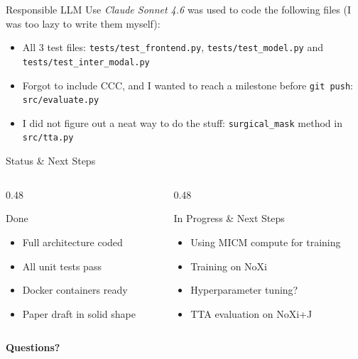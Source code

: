 \documentclass[aspectratio=169]{beamer}
\begin{document}
	\begin{frame}{Responsible LLM Use}
		\textit{Claude Sonnet 4.6} was used to code the following files (I was too lazy to write them myself):
		\begin{itemize}
			\item All 3 test files: \texttt{tests/test\_frontend.py}, \texttt{tests/test\_model.py} and \texttt{tests/test\_inter\_modal.py}
			\item Forgot to include CCC, and I wanted to reach a milestone before \texttt{git push}: \texttt{src/evaluate.py}
			\item I did not figure out a neat way to do the stuff: \texttt{surgical\_mask} method in \texttt{src/tta.py} 
		\end{itemize}
	\end{frame}

	\begin{frame}{Status \& Next Steps}
		\begin{columns}[onlytextwidth]
			\begin{column}{0.48\textwidth}
				\begin{block}{Done \checkmark}
					\small
					\begin{itemize}
						\item Full architecture coded
						\item All unit tests pass
						\item Docker containers ready
						\item Paper draft in solid shape
					\end{itemize}
				\end{block}
			\end{column}
			\begin{column}{0.48\textwidth}
				\begin{block}{In Progress \& Next Steps}
					\small
					\begin{itemize}
						\item Using MICM compute for training
						\item Training on NoXi
						\item Hyperparameter tuning?
						\item TTA evaluation on NoXi+J
					\end{itemize}
				\end{block}
			\end{column}
		\end{columns}
		\vspace{0.8em}
		\begin{center}
			\Large\bfseries\color{coolpurple} Questions?
		\end{center}
	\end{frame}
\end{document}
